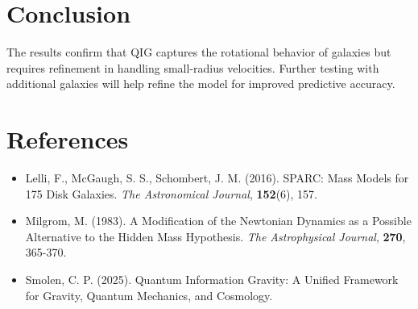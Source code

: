 \documentclass{article}
\begin{document}
\section{Conclusion}
The results confirm that QIG captures the rotational behavior of galaxies but requires refinement in handling small-radius velocities. Further testing with additional galaxies will help refine the model for improved predictive accuracy.

\section{References}
\begin{itemize}
    \item Lelli, F., McGaugh, S. S., Schombert, J. M. (2016). SPARC: Mass Models for 175 Disk Galaxies. \textit{The Astronomical Journal}, \textbf{152}(6), 157.
    \item Milgrom, M. (1983). A Modification of the Newtonian Dynamics as a Possible Alternative to the Hidden Mass Hypothesis. \textit{The Astrophysical Journal}, \textbf{270}, 365-370.
    \item Smolen, C. P. (2025). Quantum Information Gravity: A Unified Framework for Gravity, Quantum Mechanics, and Cosmology.
\end{itemize}
\end{document}
